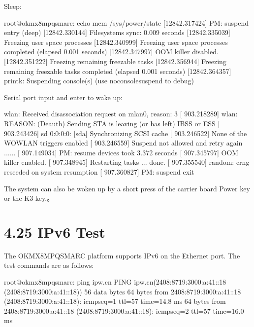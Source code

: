 \documentclass[letterpaper,10pt,openany,english]{sphinxmanual}
\begin{document}
\sphinxAtStartPar
Sleep:

\begin{sphinxVerbatim}[commandchars=\\\{\}]
root@ok\PYGZhy{}mx8mpq\PYGZhy{}smarc:\PYGZti{}\PYGZsh{} echo mem \PYGZgt{} /sys/power/state 
[12842.317424] PM: suspend entry (deep)
[12842.330144] Filesystems sync: 0.009 seconds
[12842.335039] Freezing user space processes
[12842.340999] Freezing user space processes completed (elapsed 0.001 seconds)
[12842.347997] OOM killer disabled.
[12842.351222] Freezing remaining freezable tasks
[12842.356944] Freezing remaining freezable tasks completed (elapsed 0.001 seconds)
[12842.364357] printk: Suspending console(s) (use no\PYGZus{}console\PYGZus{}suspend to debug)
\end{sphinxVerbatim}

\sphinxAtStartPar
Serial port input and enter to wake up:

\begin{sphinxVerbatim}[commandchars=\\\{\}]
[  903.218278] wlan: Received disassociation request on mlan0, reason: 3
[  903.218289] wlan: REASON: (Deauth) Sending STA is leaving (or has left) IBSS or ESS
[  903.243426] sd 0:0:0:0: [sda] Synchronizing SCSI cache
[  903.246522] None of the WOWLAN triggers enabled
[  903.246559] Suspend not allowed and retry again
......
[  907.149034] PM: resume devices took 3.372 seconds
[  907.345797] OOM killer enabled.
[  907.348945] Restarting tasks ... done.
[  907.355540] random: crng reseeded on system resumption
[  907.360827] PM: suspend exit
\end{sphinxVerbatim}

\sphinxAtStartPar
The system can also be woken up by a short press of the carrier board Power key or the K3 key.。


\section{4.25 IPv6 Test}
\label{\detokenize{linux-manual:ipv6-test}}
\sphinxAtStartPar
The OK\sphinxhyphen{}MX8MPQ\sphinxhyphen{}SMARC platform supports IPv6 on the Ethernet port. The test commands are as follows:

\begin{sphinxVerbatim}[commandchars=\\\{\}]
root@ok\PYGZhy{}mx8mpq\PYGZhy{}smarc:\PYGZti{}\PYGZsh{} ping ipw.cn
PING ipw.cn(2408:8719:3000:a:41::18 (2408:8719:3000:a:41::18)) 56 data bytes
64 bytes from 2408:8719:3000:a:41::18 (2408:8719:3000:a:41::18): icmp\PYGZus{}seq=1 ttl=57 time=14.8 ms
64 bytes from 2408:8719:3000:a:41::18 (2408:8719:3000:a:41::18): icmp\PYGZus{}seq=2 ttl=57 time=16.0 ms
\end{sphinxVerbatim}
\end{document}
